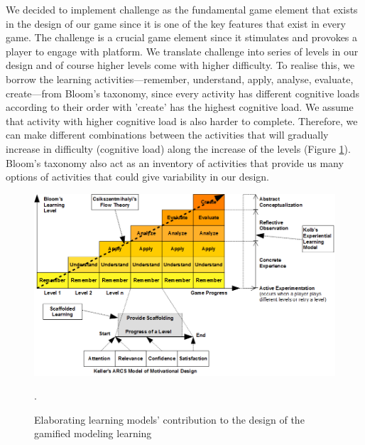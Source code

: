 \documentclass[12pt, a4paper]{report} \usepackage[titletoc]{appendix}
\begin{document}
\begin{appendices}
We decided to implement challenge as the fundamental game element that exists in the design of our game since it is one of the key features that exist in every game. The challenge is a crucial game element since it stimulates and provokes a player to engage with platform. We translate challenge into series of levels in our design and of course higher levels come with higher difficulty. To realise this, we borrow the learning activities---remember, understand, apply, analyse, evaluate, create---from Bloom's taxonomy, since every activity has different cognitive loads according to their order with 'create' has the highest cognitive load. We assume that activity with higher cognitive load is also harder to complete. Therefore, we can make different combinations between the activities that will gradually increase in difficulty (cognitive load) along the increase of the levels (Figure \ref{learning-models}). Bloom's taxonomy also act as an inventory of activities that provide us many options of activities that could give variability in our design. 

\begin{figure}[ht]
\centering
\includegraphics[width=\textwidth]{learning-models}
\caption{Elaborating learning models' contribution to the design of the gamified modeling learning}.
\label{learning-models}
\end{figure}


\end{appendices}
\end{document}
